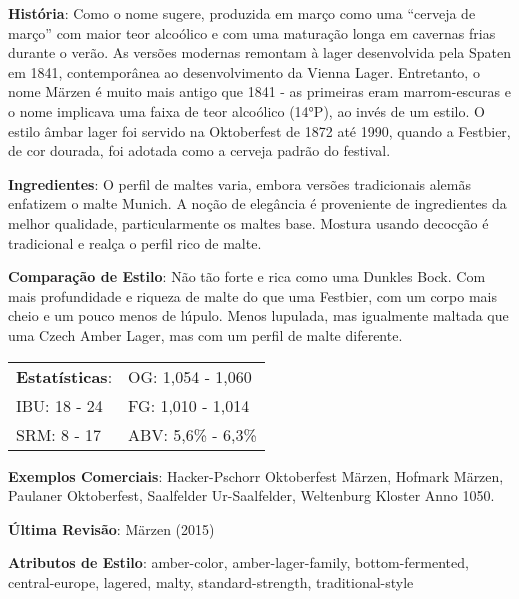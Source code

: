 \textbf{História}: Como o nome sugere, produzida em março como uma “cerveja de março” com maior teor alcoólico e com uma maturação longa em cavernas frias durante o verão. As versões modernas remontam à lager desenvolvida pela Spaten em 1841, contemporânea ao desenvolvimento da Vienna Lager. Entretanto, o nome Märzen é muito mais antigo que 1841 - as primeiras eram marrom-escuras e o nome implicava uma faixa de teor alcoólico (14°P), ao invés de um estilo. O estilo âmbar lager foi servido na Oktoberfest de 1872 até 1990, quando a Festbier, de cor dourada, foi adotada como a cerveja padrão do festival.

\textbf{Ingredientes}: O perfil de maltes varia, embora versões tradicionais alemãs enfatizem o malte Munich. A noção de elegância é proveniente de ingredientes da melhor qualidade, particularmente os maltes base. Mostura usando decocção é tradicional e realça o perfil rico de malte.

\textbf{Comparação de Estilo}: Não tão forte e rica como uma Dunkles Bock. Com mais profundidade e riqueza de malte do que uma Festbier, com um corpo mais cheio e um pouco menos de lúpulo. Menos lupulada, mas igualmente maltada que uma Czech Amber Lager, mas com um perfil de malte diferente.

\begin{tabular}{@{}p{35mm}p{35mm}@{}}
  \textbf{Estatísticas}: & OG: 1,054 - 1,060 \\
  IBU: 18 - 24  & FG: 1,010 - 1,014  \\
  SRM: 8 - 17  & ABV: 5,6\% - 6,3\%
\end{tabular}

\textbf{Exemplos Comerciais}: Hacker-Pschorr Oktoberfest Märzen, Hofmark Märzen, Paulaner Oktoberfest, Saalfelder Ur-Saalfelder, Weltenburg Kloster Anno 1050.

\textbf{Última Revisão}: Märzen (2015)

\textbf{Atributos de Estilo}: amber-color, amber-lager-family, bottom-fermented, central-europe, lagered, malty, standard-strength, traditional-style
